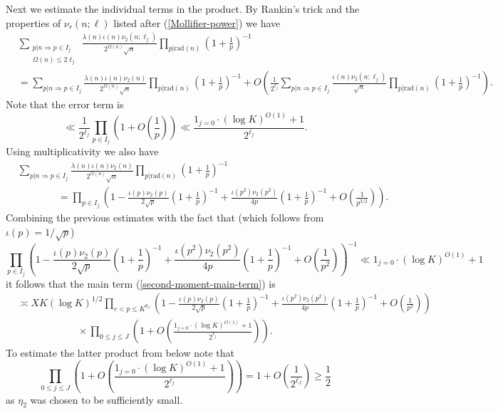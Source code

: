 \documentclass[a4paper,10pt,twoside]{amsart}
\theoremstyle{definition}
\numberwithin{equation}{section}
\renewcommand\:{\colon}
\begin{document}
Next we estimate the individual terms in the product. By Rankin's trick and the properties of $\nu_r(n;\ell)$ listed after (\ref{Mollifier-power}) we have
\begin{align*}
&\sum_{\substack{p|n\Rightarrow p\in I_j\\
\Omega(n)\leq 2\ell_j}}\frac{\lambda(n)\iota(n)\nu_2(n;\ell_j)}{2^{\Omega(n)}\sqrt n}\prod_{p|\text{rad}(n)}\left(1+\frac1p\right)^{-1}\\
&=\sum_{p|n\Rightarrow p\in I_j}\frac{\lambda(n)\iota(n)\nu_2(n)}{2^{\Omega(n)}\sqrt n}\prod_{p|\text{rad}(n)}\left(1+\frac1p\right)^{-1}+O\left(\frac1{2^{\ell_j}}\sum_{p|n\Rightarrow p\in I_j}\frac{\iota(n)\nu_2(n;\ell_j)}{\sqrt n}\prod_{p|\text{rad}(n)}\left(1+\frac1p\right)^{-1}\right).
\end{align*}
Note that the error term is 
\[ 
\ll \frac1{2^{\ell_j}}\prod_{p\in I_j}\left(1+O\left(\frac 1p\right)\right)\ll \frac{1_{j=0}\cdot(\log K)^{O(1)}+1}{2^{\ell_j}}.\]
Using multiplicativity we also have
\begin{align*}
&\sum_{p|n\Rightarrow p\in I_j}\frac{\lambda(n)\iota(n)\nu_2(n)}{2^{\Omega(n)}\sqrt n}\prod_{p|\text{rad}(n)}\left(1+\frac1p\right)^{-1}\\
&\qquad\qquad=\prod_{p\in I_j}\left(1-\frac{\iota(p)\nu_2(p)}{2\sqrt p}\left(1+\frac1p\right)^{-1}+\frac{\iota(p^2)\nu_2(p^2)}{4p}\left(1+\frac 1p\right)^{-1}+O\left(\frac1{p^{3/2}}\right)\right).
\end{align*}
Combining the previous estimates with the fact that (which follows from $\iota(p)=1/\sqrt p$)
\[
\prod_{p\in I_j}\left(1-\frac{\iota(p)\nu_2(p)}{2\sqrt p}\left(1+\frac1p\right)^{-1}+\frac{\iota(p^2)\nu_2(p^2)}{4p}\left(1+\frac 1p\right)^{-1}+O\left(\frac1{p^2}\right)\right)^{-1}\ll 1_{j=0}\cdot (\log K)^{O(1)}+1\]
it follows that the main term (\ref{second-moment-main-term}) is
\begin{align*}
&\asymp XK(\log K)^{1/2}\prod_{c<p\leq K^{\theta_J}}\left(1-\frac{\iota(p)\nu_2(p)}{2\sqrt p}\left(1+\frac1p\right)^{-1}+\frac{\iota(p^2)\nu_2(p^2)}{4p}\left(1+\frac 1p\right)^{-1}+O\left(\frac1{p^2}\right)\right)\\
&\qquad\qquad\qquad\times\prod_{0\leq j\leq J}\left(1+O\left(\frac{1_{j=0}\cdot(\log K)^{O(1)}+1}{2^{\ell_j}}\right)\right).
\end{align*}
To estimate the latter product from below note that
\[ 
\prod_{0\leq j\leq J}\left(1+O\left( \frac{1_{j=0}\cdot(\log K)^{O(1)}+1}{2^{\ell_j}}\right)\right)=1+O\left(\frac1{2^{\ell_J}}\right)\geq\frac12
\]
as $\eta_2$ was chosen to be sufficiently small. 
\end{document}
